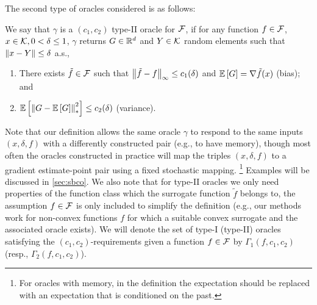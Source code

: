 The second type of oracles considered is as follows: 
\begin{definition}
\label{def:oracle2}
We say that $\gamma$ is a  $(c_1,c_2)$ type-II oracle for $\mathcal{F}$, if for any function $f\in \mathcal{F}$,
$x\in \mathcal{K},0<\delta\le 1$, $\gamma$ returns $G\in \mathbb{R}^d$ and  $Y\in \mathcal{K}$ random elements such that $\left\|x-Y\right\|\le \delta$ a.s.,
\vspace{-0.2cm}
\begin{enumerate}
\item There exists $\tilde{f} \in \mathcal{F}$ such that
$\left\|\tilde{f}- f\right\|_\infty \le c_1(\delta)$  and
$\mathbb{E}\left[G\right]  = \nabla \tilde{f}(x)$ (bias); and
\item $\mathbb{E}\left[\left\| G -  \mathbb{E}\left[G\right] \right\|_*^2\right] \le c_2(\delta)$ (variance).
\end{enumerate}
\vspace{-0.1cm}
\end{definition}
%
Note that our definition allows the same oracle $\gamma$ to respond to the same inputs $(x,\delta,f)$ with a differently constructed pair (e.g., to have memory),
though most often the oracles constructed in practice
will map the triples $(x,\delta,f)$ to a gradient estimate-point pair using a fixed stochastic mapping.%
\footnote{For oracles with memory, in the definition the expectation should be replaced with
an expectation that is conditioned on the past.}
Examples will be discussed in  \cref{sec:sbco}. We also note that for type-II oracles we only need properties of the function class which the surrogate function $\tilde{f}$ belongs to, the assumption $f \in \mathcal{F}$ is only included to simplify the definition (e.g., our methods work for non-convex functions $f$ for which a suitable convex surrogate and the associated oracle exists).
We will denote the set of type-I (type-II) oracles satisfying the $(c_1,c_2)$-requirements given a function $f\in \mathcal{F}$ by $\Gamma_1(f,c_1,c_2)$ (resp., $\Gamma_2(f,c_1,c_2)$).



